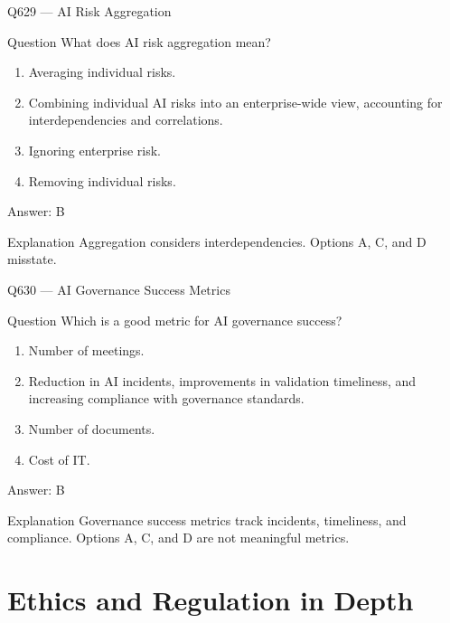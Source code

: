 \documentclass[aspectratio=169,8pt]{beamer}
\begin{document}
	\begin{frame}{Q629 --- AI Risk Aggregation}
		\begin{block}{Question}
			What does AI risk aggregation mean?
			\begin{enumerate}
				\item Averaging individual risks.
				\item Combining individual AI risks into an enterprise-wide view, accounting for interdependencies and correlations.
				\item Ignoring enterprise risk.
				\item Removing individual risks.
			\end{enumerate}
		\end{block}
		\begin{exampleblock}{Answer: B}\end{exampleblock}
		\begin{block}{Explanation}
			Aggregation considers interdependencies. Options A, C, and D misstate.
		\end{block}
	\end{frame}
	
	\begin{frame}{Q630 --- AI Governance Success Metrics}
		\begin{block}{Question}
			Which is a good metric for AI governance success?
			\begin{enumerate}
				\item Number of meetings.
				\item Reduction in AI incidents, improvements in validation timeliness, and increasing compliance with governance standards.
				\item Number of documents.
				\item Cost of IT.
			\end{enumerate}
		\end{block}
		\begin{exampleblock}{Answer: B}\end{exampleblock}
		\begin{block}{Explanation}
			Governance success metrics track incidents, timeliness, and compliance. Options A, C, and D are not meaningful metrics.
		\end{block}
	\end{frame}
	
	\section{Ethics and Regulation in Depth}
	
\end{document}
